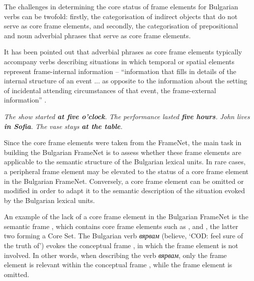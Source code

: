 \documentclass[output=paper,colorlinks,citecolor=brown]{langscibook}
\begin{document}
The challenges in determining the core status of frame elements for Bulgarian verbs can be twofold: firstly, the categorisation of indirect objects that do not serve as core frame elements, and secondly, the categorisation of prepositional and noun adverbial phrases that serve as core frame elements.

It has been pointed out that adverbial phrases as core frame elements typically accompany verbs describing situations in which temporal or spatial elements represent frame-internal information -- ``information that fills in details of the internal structure of an event ... as opposite to the information about the setting of incidental attending circumstances of that event, the frame-external information'' \citep[159]{fillmore1994}.

  \begin{exe}
 \ex  \label{ch01:ex:30}
 \textit{The show started \textbf{at five o'clock}.}
\ex  \label{ch01:ex:31}
\textit{The performance lasted \textbf{five hours}.}
\ex  \label{ch01:ex:32}
\textit{John lives \textbf{in Sofia}.}
\ex  \label{ch01:ex:33}
\textit{The vase stays \textbf{at the table}.}
 \end{exe} 
  


Since the core frame elements were taken from the FrameNet, the main task in building the Bulgarian FrameNet is to assess whether these frame elements are applicable to the semantic structure of the Bulgarian lexical units. In rare cases, a peripheral frame element may be elevated to the status of a core frame element in the Bulgarian FrameNet. Conversely, a core frame element can be omitted or modified in order to adapt it to the semantic description of the situation evoked by the Bulgarian lexical units.

An example of the lack of a core frame element in the Bulgarian FrameNet is the semantic frame , which contains core frame elements such as ,  and , the latter two forming a Core Set.
The Bulgarian verb \textit{вярвам} (believe, `COD: feel sure of the truth of') evokes the conceptual frame , in which the frame element  is not involved. In other words, when describing the verb \textit{вярвам}, only the frame element  is relevant within the conceptual frame , while the frame element  is omitted.
\end{document}
